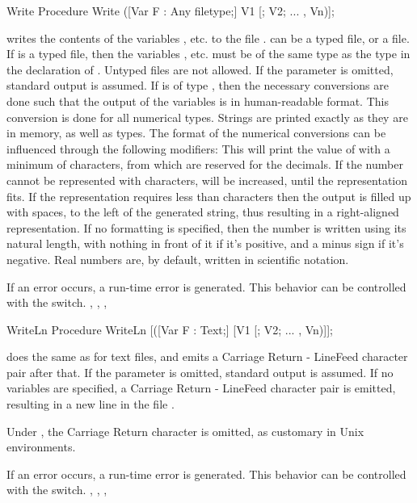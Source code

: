 \documentclass{report}
\begin{document}
\begin{procedure}{Write}
\Declaration
Procedure Write ([Var F : Any filetype;] V1 [; V2; ... , Vn)];

\Description
{} writes the contents of the variables ,  etc. to
the file .  can be a typed file, or a  file.
If  is a typed file, then the variables ,  etc. must
be of the same type as the type in the declaration of . Untyped files
are not allowed.
If the parameter  is omitted, standard output is assumed.
If  is of type , then the necessary conversions are done
such that the output of the variables is in human-readable format.
This conversion is done for all numerical types. Strings are printed exactly
as they are in memory, as well as  types.
The format of the numerical conversions can be influenced through
the following modifiers:
This will print the value of  with a minimum of
 characters, from which  are reserved for the
decimals. If the number cannot be represented with  characters,
 will be increased, until the representation fits. If the
representation requires less than  characters then the output
is filled up with spaces, to the left of the generated string, thus
resulting in a right-aligned representation.
If no formatting is specified, then the number is written using its natural
length, with nothing in front of it if it's positive, and a minus sign if
it's negative.
Real numbers are, by default, written in scientific notation.

\Errors
If an error occurs, a run-time error is generated. This behavior can be
controlled with the  switch.
\SeeAlso
{}, , , 
\end{procedure}
\begin{procedure}{WriteLn}
\Declaration
Procedure WriteLn [([Var F : Text;] [V1 [; V2; ... , Vn)]];

\Description
{} does the same as  for text files, and emits a
Carriage Return - LineFeed character pair after that.
If the parameter  is omitted, standard output is assumed.
If no variables are specified, a Carriage Return - LineFeed character pair
is emitted, resulting in a new line in the file .
\begin{remark}
Under \linux, the Carriage Return character is omitted, as
customary in Unix environments.
\end{remark}

\Errors
If an error occurs, a run-time error is generated. This behavior can be
controlled with the  switch.
\SeeAlso
{}, , , 
\end{procedure}
\end{document}

